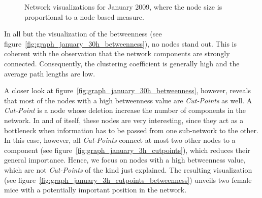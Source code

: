 \begin{figure}[htpb]
	\qquad 
		
	\caption[Network visualizations where the node size is proportional to node based measures]{Network visualizations for January 2009, where the node size is proportional to a node based measure.}
	\label{fig:graph_january_30h_node_based_measures} 
	 
\end{figure}

In all but the visualization of the betweenness (see figure~\ref{fig:graph_january_30h_betweenness}), no nodes stand out. This is coherent with the observation that the network components are strongly connected. Consequently, the clustering coefficient is generally high and the average path lengths are low.  


A closer look at figure~\ref{fig:graph_january_30h_betweenness}, however, reveals that most of the nodes with a high betweenness value are \textit{Cut-Points} as well. A \textit{Cut-Point} is a node whose deletion increase the number of components in the network\citep{pajek:03}. In and of itself, these nodes are very interesting, since they act as a bottleneck when information has to be passed from one sub-network to the other. In this case, however, all \textit{Cut-Points} connect at most two other nodes to a component (see figure~\ref{fig:graph_january_3h_cutpoints}), which reduces their general importance. Hence, we focus on nodes with a high betweenness value, which are not \textit{Cut-Points} of the kind just explained. The resulting visualization (see figure~\ref{fig:graph_january_3h_cutpoints_betweenness}) unveils two female mice with a potentially important position in the network. 

